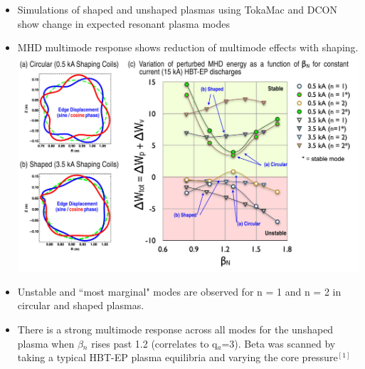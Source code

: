 \documentclass{article}
\begin{document}
\begin{multicols}{5}
\begin{itemize}
\item Simulations of shaped and unshaped plasmas using TokaMac and DCON show change in expected resonant plasma modes
\item MHD multimode response shows reduction of multimode effects with shaping.\\

\includegraphics[width=0.9\columnwidth]{ModeDWimage2}


\item Unstable and ``most marginal" modes are observed for n = 1 and n = 2 in circular and shaped plasmas. 
\item There is a strong multimode response across all modes for the unshaped plasma when  $\beta$$_n$ rises past 1.2 (correlates to q$_a$=3).  Beta was scanned by taking a typical HBT-EP plasma equilibria and varying the core pressure$^{[1]}$


\end{itemize}


\end{multicols}
\end{document}
